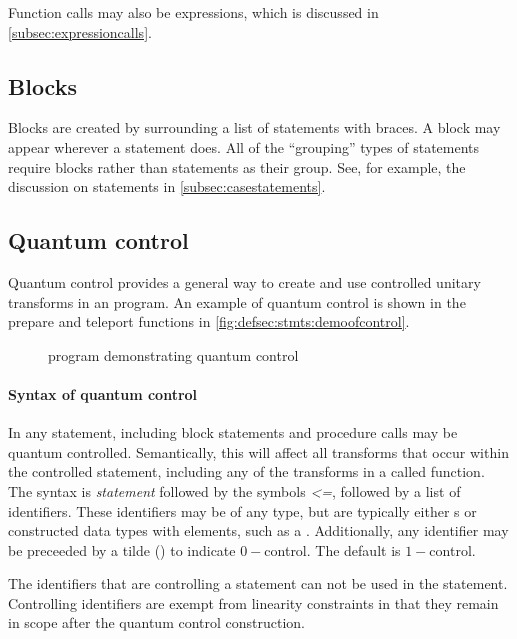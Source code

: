 Function calls may also be expressions, which is discussed in
\ref{subsec:expressioncalls}.

\subsection{Blocks}\label{subsec:blocks}
Blocks are created by surrounding a list of statements with braces. A 
block may appear wherever a statement does.  All of the ``grouping''
types of statements require blocks rather than statements as their group.
See, for example, the discussion on  statements
in \ref{subsec:casestatements}.

\subsection{Quantum control}\label{subsec:quantumcontrol}

Quantum control provides a general way to create and use controlled unitary 
transforms in an \lqpl{} program. 
An example of quantum 
control is shown in the prepare and teleport functions in
 \vref{fig:defsec:stmts:demoofcontrol}.


\begin{figure}[htbp]
\begin{singlespace}

\end{singlespace}
\caption{\lqpl{} program demonstrating quantum control}
\label{fig:defsec:stmts:demoofcontrol}
\end{figure}

\paragraph{Syntax of quantum control}
In \lqpl{} any statement, including block statements and 
procedure calls may be quantum controlled.
Semantically, this will  affect all transforms that occur within
the controlled statement, including
any of the transforms in a called function.
The  syntax is \emph{statement} 
followed by the symbols \emph{<=}, followed
by a list of identifiers.  These identifiers may 
be of any type, but are typically
either \qubit{}s or constructed data types with \qubit{} elements, such as a 
. Additionally, any identifier may be preceeded by a 
tilde (\raisebox{-.8ex}{$\,\tilde{}\,$}) to indicate $0-$control. The default is 
$1-$control.

The identifiers that are controlling a statement can not be used
in the statement. Controlling identifiers are exempt from
linearity constraints in that they remain in scope after the
quantum control construction.

